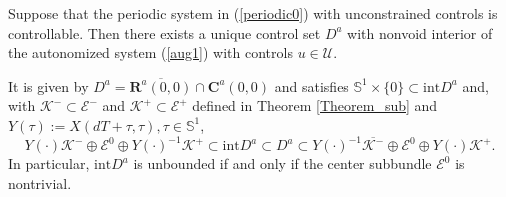 \documentclass{siamltex}%
\begin{document}
\begin{theorem}
\label{Theorem_cs1}Suppose that the periodic system in (\ref{periodic0}) with
unconstrained controls is controllable. Then there exists a unique control set
$D^{a}$ with nonvoid interior of the autonomized system (\ref{aug1}) with
controls $u\in\mathcal{U}$.

It is given by $D^{a}=\overline{\mathbf{R}^{a}(0,0)}\cap\mathbf{C}^{a}(0,0)$
and satisfies $\mathbb{S}^{1}\times\{0\}\subset\mathrm{int}D^{a}$ and, with
$\mathcal{K}^{-}\subset\mathcal{E}^{-}$ and $\mathcal{K}^{+}\subset
\mathcal{E}^{+}$ defined in Theorem \ref{Theorem_sub} and $Y(\tau
):=X(dT+\tau,\tau),\tau\in\mathbb{S}^{1}$,%
\begin{equation}
Y(\cdot)\mathcal{K}^{-}\oplus\mathcal{E}^{0}\oplus Y(\cdot)^{-1}%
\mathcal{K}^{+}\subset\mathrm{int}D^{a}\subset D^{a}\subset Y(\cdot
)^{-1}\overline{\mathcal{K}^{-}}\oplus\mathcal{E}^{0}\oplus Y(\cdot
)\mathcal{K}^{+}. \label{D_a2}%
\end{equation}
In particular, $\mathrm{int}D^{a}$ is unbounded if and only if the center
subbundle $\mathcal{E}^{0}$ is nontrivial.
\end{theorem}
\end{document}
